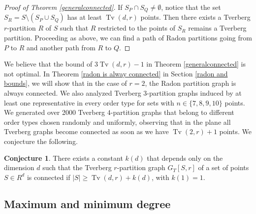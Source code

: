 \documentclass[11pt,a4paper]{article}
\theoremstyle{plain}
\theoremstyle{definition}
\newtheorem{conjecture}{Conjecture}
\newcommand{\tv}{\operatorname{Tv}}
\begin{document}
\begin{proof}[Proof of Theorem \ref{generalconnected}]
If $S_P\cap S_Q \neq \emptyset$, notice that the set $S_R = S\setminus (S_P \cup S_Q)$ has at least $\tv(d,r)$ points. Then there exists a Tverberg $r$-partition $R$ of $S$ such that $R$ restricted to the points of $S_R$ remains a Tverberg partition. Proceeding as above, we can find a path of Radon partitions going from $P$ to $R$ and another path from $R$ to $Q$. 
\end{proof}



We believe that the bound of $3\tv(d,r)-1$ in Theorem \ref{generalconnected} is not optimal. In Theorem \ref{radon is alway connected} in Section \ref{radon and bounds}, we will show that in the case of $r=2$, the Radon partition graph is always connected. We also analyzed   
Tverberg $3$-partition graphs induced by at least one representative in every order type for sets with $n\in\{7,8,9,10\}$ points. We generated over 2000 Tverberg $4$-partition graphs that belong to different order types chosen randomly and uniformly, observing that in the plane all Tverberg graphs become connected as soon as we have $\tv(2,r)+1$ points.  We conjecture the following. 

\begin{conjecture}
There exists a constant $k(d)$ that depends only on the dimension $d$ such that the Tverberg $r$-partition graph $G_T[S,r]$ of a set of points $S\in R^d$ is connected if $\vert S \vert \geq \tv(d,r)+k(d)$, with $k(1)=1$.
\end{conjecture}

\subsection{Maximum and minimum degree}\label{MaxyMin}

\end{document}
